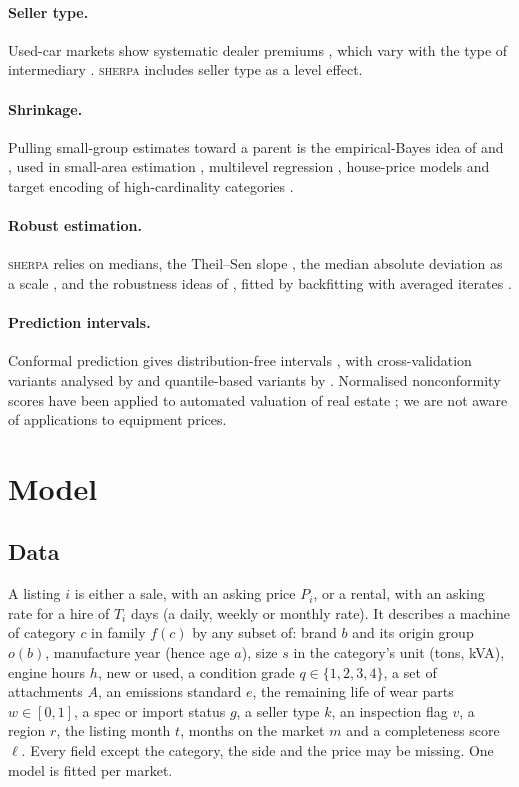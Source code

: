 \documentclass[11pt]{article}
\newcommand{\sherpa}{\textsc{sherpa}}
\begin{document}
\paragraph{Seller type.}
Used-car markets show systematic dealer premiums \citep{genesove1993,emons2009,biglaiser2020}, which
vary with the type of intermediary \citep{li2025}. \sherpa{} includes seller type as a level effect.

\paragraph{Shrinkage.}
Pulling small-group estimates toward a parent is the empirical-Bayes idea of
\citet{james1961} and \citet{efron1973,efron1975}, used in small-area estimation
\citep{fay1979}, multilevel regression \citep{gelman2007}, house-price models
\citep{brunauer2013,gelfand2004,goodman2003} and target encoding of high-cardinality categories
\citep{miccibarreca2001}.

\paragraph{Robust estimation.}
\sherpa{} relies on medians, the Theil--Sen slope \citep{theil1950,sen1968}, the median absolute
deviation as a scale \citep{hampel1974,rousseeuw1993}, and the robustness ideas of
\citet{huber1964}, fitted by backfitting \citep{hastie1986,hastie1990} with averaged iterates
\citep{polyak1992}.

\paragraph{Prediction intervals.}
Conformal prediction gives distribution-free intervals \citep{vovk2005,lei2018}, with
cross-validation variants analysed by \citet{barber2021} and quantile-based variants by
\citet{romano2019}. Normalised nonconformity scores have been applied to automated valuation of
real estate \citep{bellotti2017,lim2021,bastos2025,hjort2025}; we are not aware of applications to
equipment prices.

\section{Model}
\label{sec:model}

\subsection{Data}
A listing $i$ is either a sale, with an asking price $P_i$, or a rental, with an asking rate for a
hire of $T_i$ days (a daily, weekly or monthly rate). It describes a machine of category $c$ in
family $f(c)$ by any subset of: brand $b$ and its origin group $o(b)$, manufacture year (hence age
$a$), size $s$ in the category's unit (tons, kVA), engine hours $h$, new or used, a condition grade
$q\in\{1,2,3,4\}$, a set of attachments $A$, an emissions standard $e$, the remaining life of wear
parts $w\in[0,1]$, a spec or import status $g$, a seller type $k$, an inspection flag $v$, a region
$r$, the listing month $t$, months on the market $m$ and a completeness score $\ell$. Every field
except the category, the side and the price may be missing. One model is fitted per market.
\end{document}
